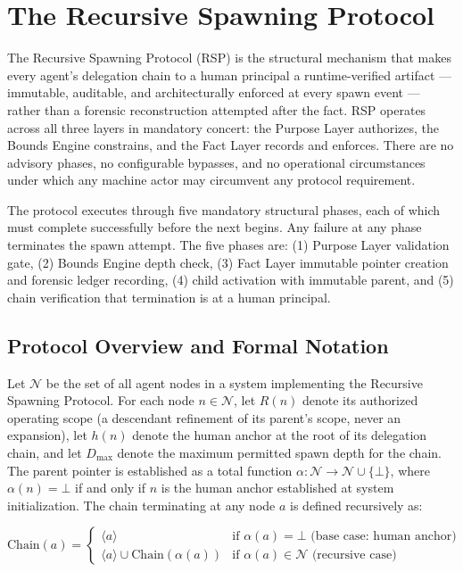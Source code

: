 \section{The Recursive Spawning Protocol}
\label{sec:rs-protocol}

The Recursive Spawning Protocol (RSP) is the structural mechanism that makes every agent's delegation chain to a human principal a runtime-verified artifact — immutable, auditable, and architecturally enforced at every spawn event — rather than a forensic reconstruction attempted after the fact. RSP operates across all three \bxthree{} layers in mandatory concert: the Purpose Layer authorizes, the Bounds Engine constrains, and the Fact Layer records and enforces. There are no advisory phases, no configurable bypasses, and no operational circumstances under which any machine actor may circumvent any protocol requirement.

The protocol executes through five mandatory structural phases, each of which must complete successfully before the next begins. Any failure at any phase terminates the spawn attempt. The five phases are: (1) Purpose Layer validation gate, (2) Bounds Engine depth check, (3) Fact Layer immutable pointer creation and forensic ledger recording, (4) child activation with immutable parent, and (5) chain verification that termination is at a human principal.

\subsection{Protocol Overview and Formal Notation}

Let $\mathcal{N}$ be the set of all agent nodes in a \bxthree{} system implementing the Recursive Spawning Protocol. For each node $n \in \mathcal{N}$, let $R(n)$ denote its authorized operating scope (a descendant refinement of its parent's scope, never an expansion), let $h(n)$ denote the human anchor at the root of its delegation chain, and let $D_{\max}$ denote the maximum permitted spawn depth for the chain. The parent pointer is established as a total function $\alpha : \mathcal{N} \to \mathcal{N} \cup \{\bot\}$, where $\alpha(n) = \bot$ if and only if $n$ is the human anchor established at system initialization. The chain terminating at any node $a$ is defined recursively as:

\begin{equation}
\mathrm{Chain}(a) = 
\begin{cases}
\langle a \rangle & \text{if } \alpha(a) = \bot \text{ (base case: human anchor)} \\
\langle a \rangle \cup \mathrm{Chain}(\alpha(a)) & \text{if } \alpha(a) \in \mathcal{N} \text{ (recursive case)}
\end{cases}
\end{equation}

